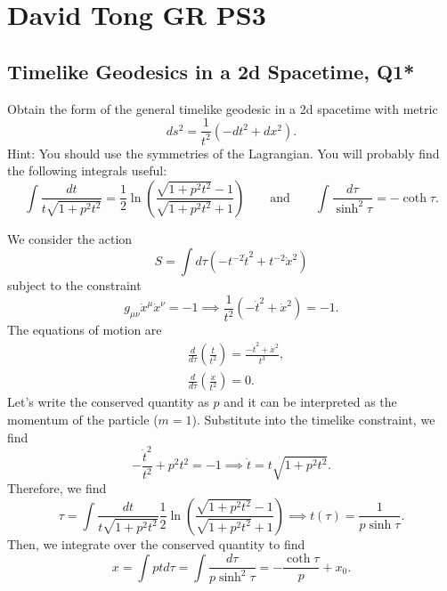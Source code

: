 \section{David Tong GR PS3}


\subsection{Timelike Geodesics in a 2d Spacetime, Q1*}

Obtain the form of the general timelike geodesic in a 2d spacetime with metric
\begin{equation}
    ds^2 = \frac{1}{t^2}(-dt^2 + dx^2).
\end{equation}
Hint: You should use the symmetries of the Lagrangian. You will probably find the following integrals useful:
\begin{equation}
    \int \frac{dt}{t\sqrt{1+p^2t^2}} = \frac{1}{2}\ln\left(\frac{\sqrt{1+p^2t^2}-1}{\sqrt{1+p^2t^2}+1}\right) \qquad \text{and} \qquad \int \frac{d\tau}{\sinh^2\tau} = -\coth\tau.
\end{equation}
\begin{solution}
    We consider the action 
    \begin{equation}
        S = \int d\tau (- t^{-2}\dot{t}^2 + t^{-2}\dot{x}^2)
    \end{equation}
    subject to the constraint
    \begin{equation}
        g_{\mu\nu}\dot{x}^\mu\dot{x}^\nu = -1 \implies \frac{1}{t^2}(-\dot{t}^2 + \dot{x}^2)=-1.
    \end{equation}
    The equations of motion are
    \begin{align}
        &\frac{d}{d\tau}\left(\frac{\dot{t}}{t^2}\right) = \frac{-\dot{t}^2 +\dot{x}^2}{t^3},\\
        &\frac{d}{d\tau}\left(\frac{\dot{x}}{t^2}\right) = 0.
    \end{align}
    Let's write the conserved quantity as $p$ and it can be interpreted as the momentum of the particle ($m=1$). Substitute into the timelike constraint, we find
    \begin{equation}
         -\frac{\dot{t}^2}{t^2} + p^2t^2 = -1\implies \dot{t} = t\sqrt{1+p^2t^2}.
    \end{equation}
    Therefore, we find
    \begin{equation}
        \tau = \int \frac{dt}{t\sqrt{1+p^2t^2}}  \frac{1}{2}\ln\left(\frac{\sqrt{1+p^2t^2}-1}{\sqrt{1+p^2t^2}+1}\right) \implies t(\tau) = \frac{1}{p\sinh \tau}.
    \end{equation}
    Then, we integrate over the conserved quantity to find
    \begin{equation}
        x = \int ptd\tau = \int\frac{d\tau}{p\sinh^2\tau} = -\frac{\coth\tau}{p}+x_0.
    \end{equation}

    
\end{solution}


